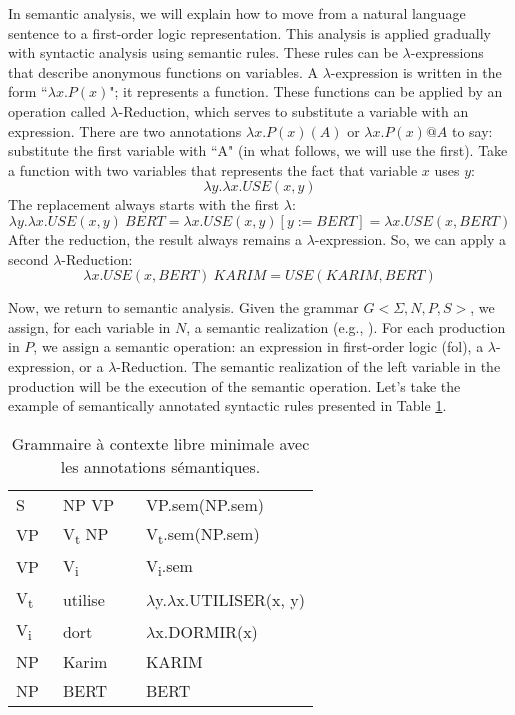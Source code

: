 \documentclass{KBook}
\begin{document}
In semantic analysis, we will explain how to move from a natural language sentence to a first-order logic representation. This analysis is applied gradually with syntactic analysis using semantic rules. These rules can be $\lambda $-expressions that describe anonymous functions on variables. A $\lambda $-expression is written in the form ``$ \lambda x.P(x)$"; it represents a function. These functions can be applied by an operation called $\lambda $-Reduction, which serves to substitute a variable with an expression. There are two annotations $ \lambda x.P(x)(A)$ or $ \lambda x.P(x)@A$ to say: substitute the first variable with ``A" (in what follows, we will use the first). Take a function with two variables that represents the fact that variable $x$ uses $y$: 
\[\lambda y.\lambda x.USE(x, y)\]
The replacement always starts with the first $\lambda$:
\[\lambda y.\lambda x.USE(x, y)\ BERT = \lambda x.USE(x, y)[y := BERT] = \lambda x.USE(x, BERT)\] 
After the reduction, the result always remains a $\lambda $-expression. So, we can apply a second $\lambda $-Reduction:
\[\lambda x.USE(x, BERT)\ KARIM = USE(KARIM, BERT)\]


Now, we return to semantic analysis. Given the grammar $G <\Sigma, N, P, S>$, we assign, for each variable in $N$, a semantic realization (e.g., ). 
For each production in $P$, we assign a semantic operation: an expression in first-order logic (\ac{fol}), a $\lambda $-expression, or a $\lambda $-Reduction. 
The semantic realization of the left variable in the production will be the execution of the semantic operation. 
Let's take the example of semantically annotated syntactic rules presented in Table \ref{tab:regles-sem1}.


\begin{table}[ht]
	\centering
	\begin{tabular}{llll}
		\hline\hline
		S  & \textrightarrow\ NP VP && VP.sem(NP.sem) \\
		VP & \textrightarrow\ V\textsubscript{t} NP && V\textsubscript{t}.sem(NP.sem)\\
		VP & \textrightarrow\ V\textsubscript{i} && V\textsubscript{i}.sem \\
		V\textsubscript{t}  & \textrightarrow\ utilise && $ \lambda $y.$ \lambda $x.UTILISER(x, y) \\
		V\textsubscript{i}  & \textrightarrow\ dort && $ \lambda $x.DORMIR(x) \\
		NP  & \textrightarrow\  Karim && KARIM \\
		NP  & \textrightarrow\  BERT && BERT \\
		\hline\hline
	\end{tabular}
	\caption{Grammaire à contexte libre minimale avec les annotations sémantiques.}
	\label{tab:regles-sem1}
\end{table}
\end{document}
